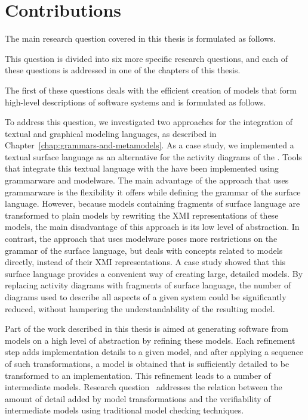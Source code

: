 \section{Contributions}
\label{sec:conclusions:contributions}

The main research question covered in this thesis is formulated as follows.

\RQMain

\noindent
This question is divided into six more specific research questions,
and each of these questions is addressed in one of the chapters of this thesis.


The first of these questions deals with the efficient creation of models that form high-level descriptions of software systems and is formulated as follows.

\RQOne

\noindent
To address this question, we investigated two approaches for the integration of textual and graphical modeling languages, as described in Chapter~\ref{chap:grammars-and-metamodels}.
As a case study, we implemented a textual surface language as an alternative for the activity diagrams of the \UML.
Tools that integrate this textual language with the \UML have been implemented using grammarware and modelware.
The main advantage of the approach that uses grammarware is the flexibility it offers while defining the grammar of the surface language.
However, because models containing fragments of surface language are transformed to plain models by rewriting the XMI representations of these models, the main disadvantage of this approach is its low level of abstraction.
In contrast, the approach that uses modelware poses more restrictions on the grammar of the surface language, but deals with concepts related to models directly, instead of their XMI representations.
A case study showed that this surface language provides a convenient way of creating large, detailed \UML models.
By replacing activity diagrams with fragments of surface language, the number of diagrams used to describe all aspects of a given system could be significantly reduced, without hampering the understandability of the resulting model.


Part of the work described in this thesis is aimed at generating software from models on a high level of abstraction by refining these models.
Each refinement step adds implementation details to a given model, and after applying a sequence of such transformations, a model is obtained that is sufficiently detailed to be transformed to an implementation.
This refinement leads to a number of intermediate models.
Research question~ addresses the relation between the amount of detail added by model transformations and the verifiability of intermediate models using traditional model checking techniques.

